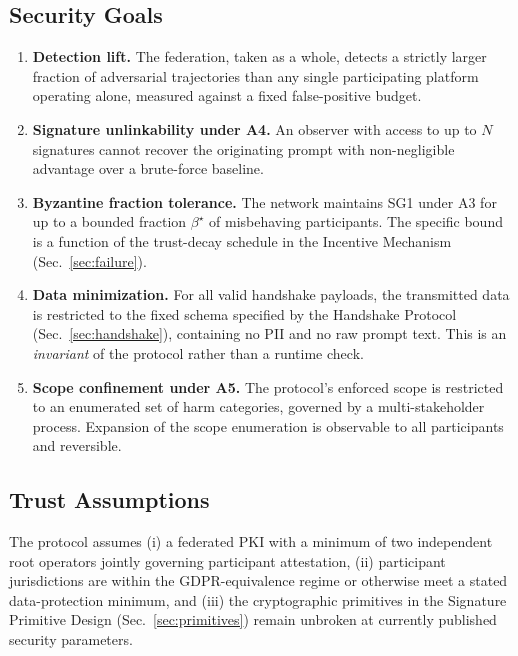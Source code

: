 \documentclass[11pt]{article}
\begin{document}
\subsection{Security Goals}
\begin{enumerate}[label=(SG\arabic*), leftmargin=2.4em]
\item \textbf{Detection lift.} The federation, taken as a whole, detects a strictly larger fraction of adversarial trajectories than any single participating platform operating alone, measured against a fixed false-positive budget.
\item \textbf{Signature unlinkability under A4.} An observer with access to up to $N$ signatures cannot recover the originating prompt with non-negligible advantage over a brute-force baseline.
\item \textbf{Byzantine fraction tolerance.} The network maintains SG1 under A3 for up to a bounded fraction $\beta^\star$ of misbehaving participants. The specific bound is a function of the trust-decay schedule in the Incentive Mechanism (Sec.~\ref{sec:failure}).
\item \textbf{Data minimization.} For all valid handshake payloads, the transmitted data is restricted to the fixed schema specified by the Handshake Protocol (Sec.~\ref{sec:handshake}), containing no PII and no raw prompt text. This is an \emph{invariant} of the protocol rather than a runtime check.
\item \textbf{Scope confinement under A5.} The protocol's enforced scope is restricted to an enumerated set of harm categories, governed by a multi-stakeholder process. Expansion of the scope enumeration is observable to all participants and reversible.
\end{enumerate}

\subsection{Trust Assumptions}
The protocol assumes (i) a federated PKI with a minimum of two independent root operators jointly governing participant attestation, (ii) participant jurisdictions are within the GDPR-equivalence regime or otherwise meet a stated data-protection minimum, and (iii) the cryptographic primitives in the Signature Primitive Design (Sec.~\ref{sec:primitives}) remain unbroken at currently published security parameters.
\end{document}
